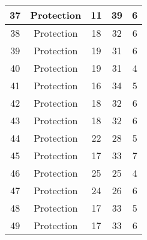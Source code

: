 \documentclass[results.tex]{subfiles}
\begin{document}
\begin{center}
\begin{tabular}{| c || c | c | c | c |}
            \hline
            37                      & Protection                   & 11                     & 39                      & 6                    \\
            \hline
            38                      & Protection                   & 18                     & 32                      & 6                    \\
            \hline
            39                      & Protection                   & 19                     & 31                      & 6                    \\
            \hline
            40                      & Protection                   & 19                     & 31                      & 4                    \\
            \hline
            41                      & Protection                   & 16                     & 34                      & 5                    \\
            \hline
            42                      & Protection                   & 18                     & 32                      & 6                    \\
            \hline
            43                      & Protection                   & 18                     & 32                      & 6                    \\
            \hline
            44                      & Protection                   & 22                     & 28                      & 5                    \\
            \hline
            45                      & Protection                   & 17                     & 33                      & 7                    \\
            \hline
            46                      & Protection                   & 25                     & 25                      & 4                    \\
            \hline
            47                      & Protection                   & 24                     & 26                      & 6                    \\
            \hline
            48                      & Protection                   & 17                     & 33                      & 5                    \\
            \hline
            49                      & Protection                   & 17                     & 33                      & 6                    \\
            \hline
        \end{tabular}
    \end{center}
\end{document}
